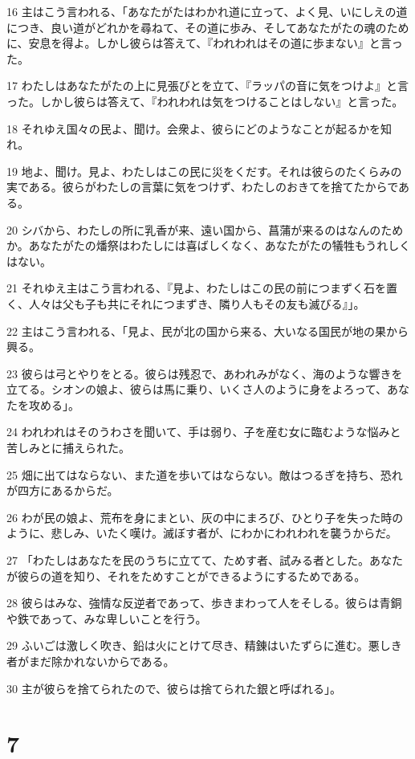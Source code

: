 \par 16 主はこう言われる、「あなたがたはわかれ道に立って、よく見、いにしえの道につき、良い道がどれかを尋ねて、その道に歩み、そしてあなたがたの魂のために、安息を得よ。しかし彼らは答えて、『われわれはその道に歩まない』と言った。
\par 17 わたしはあなたがたの上に見張びとを立て、『ラッパの音に気をつけよ』と言った。しかし彼らは答えて、『われわれは気をつけることはしない』と言った。
\par 18 それゆえ国々の民よ、聞け。会衆よ、彼らにどのようなことが起るかを知れ。
\par 19 地よ、聞け。見よ、わたしはこの民に災をくだす。それは彼らのたくらみの実である。彼らがわたしの言葉に気をつけず、わたしのおきてを捨てたからである。
\par 20 シバから、わたしの所に乳香が来、遠い国から、菖蒲が来るのはなんのためか。あなたがたの燔祭はわたしには喜ばしくなく、あなたがたの犠牲もうれしくはない。
\par 21 それゆえ主はこう言われる、『見よ、わたしはこの民の前につまずく石を置く、人々は父も子も共にそれにつまずき、隣り人もその友も滅びる』」。
\par 22 主はこう言われる、「見よ、民が北の国から来る、大いなる国民が地の果から興る。
\par 23 彼らは弓とやりをとる。彼らは残忍で、あわれみがなく、海のような響きを立てる。シオンの娘よ、彼らは馬に乗り、いくさ人のように身をよろって、あなたを攻める」。
\par 24 われわれはそのうわさを聞いて、手は弱り、子を産む女に臨むような悩みと苦しみとに捕えられた。
\par 25 畑に出てはならない、また道を歩いてはならない。敵はつるぎを持ち、恐れが四方にあるからだ。
\par 26 わが民の娘よ、荒布を身にまとい、灰の中にまろび、ひとり子を失った時のように、悲しみ、いたく嘆け。滅ぼす者が、にわかにわれわれを襲うからだ。
\par 27 「わたしはあなたを民のうちに立てて、ためす者、試みる者とした。あなたが彼らの道を知り、それをためすことができるようにするためである。
\par 28 彼らはみな、強情な反逆者であって、歩きまわって人をそしる。彼らは青銅や鉄であって、みな卑しいことを行う。
\par 29 ふいごは激しく吹き、鉛は火にとけて尽き、精錬はいたずらに進む。悪しき者がまだ除かれないからである。
\par 30 主が彼らを捨てられたので、彼らは捨てられた銀と呼ばれる」。

\chapter{7}

